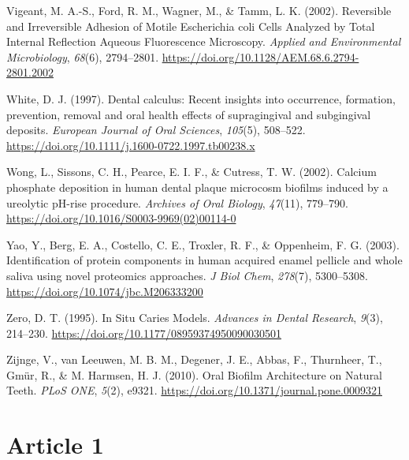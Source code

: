 \documentclass[
  b5paper,
]{book}
\newlength{\cslhangindent}
\newenvironment{CSLReferences}[2] %
 {\begin{list}{}{%
  \setlength{\itemindent}{0pt}
  \setlength{\leftmargin}{0pt}
  \setlength{\parsep}{0pt}
  \ifodd #1
   \setlength{\leftmargin}{\cslhangindent}
   \setlength{\itemindent}{-1\cslhangindent}
  \fi
  \setlength{\itemsep}{#2\baselineskip}}}
 {\end{list}}
\begin{document}
\begin{CSLReferences}{1}{0}
Vigeant, M. A.-S., Ford, R. M., Wagner, M., \& Tamm, L. K. (2002).
Reversible and {Irreversible Adhesion} of {Motile Escherichia} coli
{Cells Analyzed} by {Total Internal Reflection Aqueous Fluorescence
Microscopy}. \emph{Applied and Environmental Microbiology},
\emph{68}(6), 2794--2801.
\url{https://doi.org/10.1128/AEM.68.6.2794-2801.2002}

White, D. J. (1997). Dental calculus: Recent insights into occurrence,
formation, prevention, removal and oral health effects of supragingival
and subgingival deposits. \emph{European Journal of Oral Sciences},
\emph{105}(5), 508--522.
\url{https://doi.org/10.1111/j.1600-0722.1997.tb00238.x}

Wong, L., Sissons, C. H., Pearce, E. I. F., \& Cutress, T. W. (2002).
Calcium phosphate deposition in human dental plaque microcosm biofilms
induced by a ureolytic {pH-rise} procedure. \emph{Archives of Oral
Biology}, \emph{47}(11), 779--790.
\url{https://doi.org/10.1016/S0003-9969(02)00114-0}

Yao, Y., Berg, E. A., Costello, C. E., Troxler, R. F., \& Oppenheim, F.
G. (2003). Identification of protein components in human acquired enamel
pellicle and whole saliva using novel proteomics approaches. \emph{J
Biol Chem}, \emph{278}(7), 5300--5308.
\url{https://doi.org/10.1074/jbc.M206333200}

Zero, D. T. (1995). In {Situ Caries Models}. \emph{Advances in Dental
Research}, \emph{9}(3), 214--230.
\url{https://doi.org/10.1177/08959374950090030501}

Zijnge, V., van Leeuwen, M. B. M., Degener, J. E., Abbas, F., Thurnheer,
T., Gmür, R., \& M. Harmsen, H. J. (2010). Oral {Biofilm Architecture}
on {Natural Teeth}. \emph{PLoS ONE}, \emph{5}(2), e9321.
\url{https://doi.org/10.1371/journal.pone.0009321}

\end{CSLReferences}


\chapter{Article 1}\label{byoc-valid}
\end{document}
